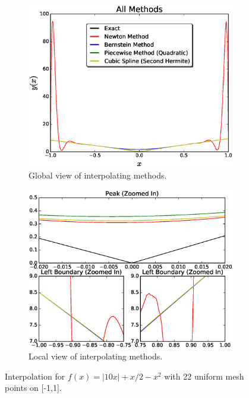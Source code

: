 \documentclass[12pt]{article}
\theoremstyle{remark}
\begin{document}
\begin{figure}[H]
	\centering
	\begin{subfigure}{.5\textwidth}
		\centering
		\includegraphics[width=1.1\linewidth]{fig2.eps}
		\caption{Global view of interpolating methods.}
		\label{fig:sub1}
	\end{subfigure}%
	\begin{subfigure}{.5\textwidth}
		\centering
		\includegraphics[width=1.1\linewidth]{subFig2.eps}
		\caption{Local view of interpolating methods.}
		\label{fig:sub2}
	\end{subfigure}
	\caption{Interpolation for $f(x) = \vert10x\vert + x/2 - x^2$ with 22 uniform mesh points on [-1,1].}
	\label{fig:test}
\end{figure}
\end{document}
